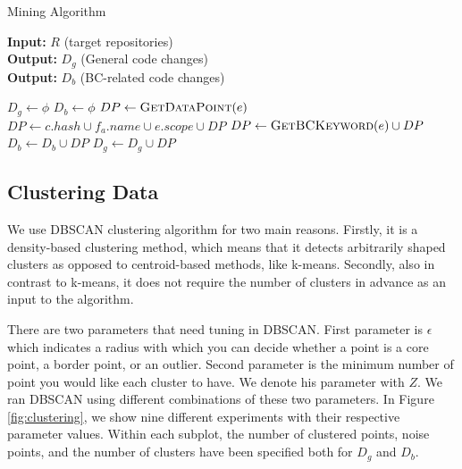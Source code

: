 \begin{algorithm}
\caption{\label{alg} Mining Algorithm}
\hspace*{2mm} \textbf{Input:} $R$ (target repositories)  \\
\hspace*{2mm} \textbf{Output:} $D_g$ (General code changes) \\
\hspace*{2mm} \textbf{Output:} $D_b$ (BC-related code changes)
\begin{algorithmic}
\State $D_g \leftarrow \phi$
\State $D_b \leftarrow \phi$
                    \State $DP \leftarrow \textsc{GetDataPoint}(e)$
                    \State $DP \leftarrow c.hash \cup f_a.name \cup e.scope \cup DP $
                        \State $DP \leftarrow \textsc{GetBCKeyword}(e) \cup DP $
                        \State $D_b \leftarrow D_b \cup DP$
                    \Else
                        \State $D_g \leftarrow D_g \cup DP$
                    \EndIf
                \EndFor
            \EndFor
        \EndIf
    \EndFor
\EndFor
\end{algorithmic}
\end{algorithm}

\subsection{\label{sec:clustering_data}Clustering Data}

We use DBSCAN clustering algorithm for two main reasons. Firstly, it is a density-based clustering method, which means that it detects arbitrarily shaped clusters as opposed to centroid-based methods, like k-means. Secondly, also in contrast to k-means, it does not require the number of clusters in advance as an input to the algorithm.

There are two parameters that need tuning in DBSCAN. First parameter is $\epsilon$ which indicates a radius with which you can decide whether a point is a core point, a border point, or an outlier. Second parameter is the minimum number of point you would like each cluster to have. We denote his parameter with $Z$. We ran DBSCAN using different combinations of these two parameters. In Figure \ref{fig:clustering}, we show nine different experiments with their respective parameter values. Within each subplot, the number of clustered points, noise points, and the number of clusters have been specified both for $D_g$ and $D_b$. 


